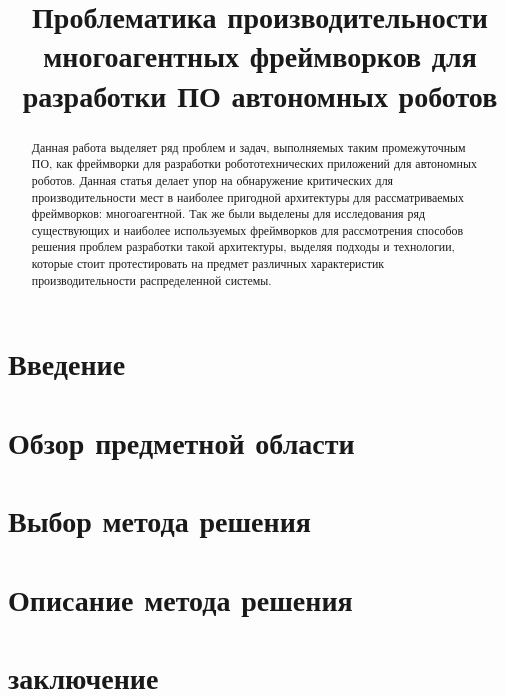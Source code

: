 \documentclass[conference]{IEEEtran}
\begin{document}
	\title{Проблематика производительности многоагентных фреймворков для разработки ПО автономных роботов}
	\author{
	}

	\maketitle
	\begin{abstract}
		Данная работа выделяет ряд проблем и задач, выполняемых таким промежуточным ПО, как фреймворки для разработки робототехнических приложений для автономных роботов. Данная статья делает упор на обнаружение критических для производительности мест в наиболее пригодной архитектуры для рассматриваемых фреймворков: многоагентной. Так же были выделены для исследования ряд существующих и наиболее используемых  фреймворков для рассмотрения способов решения проблем разработки такой архитектуры, выделяя подходы и технологии, которые стоит протестировать на предмет различных характеристик производительности распределенной системы.
	\end{abstract}

	\section{Введение}
		
	\section{Обзор предметной области }
		
	\section{Выбор метода решения}
		
	\section{Описание метода решения}
		
	\section{заключение}
		
		
		
	
	
%		
%		
	
	
\end{document}
